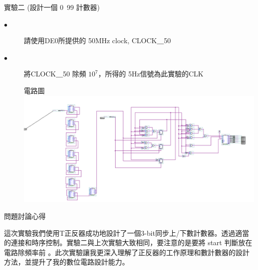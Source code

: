 \documentclass[12pt, a4paper]{article}
\begin{document}
\begin{description}
\begin{description}
          \fontsize{20pt}{22pt}\selectfont
          \item 實驗二 (設計一個 0~99 計數器)
            \fontsize{16pt}{18pt}\selectfont
              \begin{description}
                \item [$\bullet$]請使用DE0所提供的 50MHz clock, CLOCK＿50
                \item [$\bullet$] 將CLOCK＿50 除頻 $10^7$，所得的 5Hz信號為此實驗的CLK\\
                \fontsize{18pt}{20pt}
                  \item []電路圖 \\[.3cm]
                    \includegraphics[width=13cm]{./image/ex2.png}
              \end{description}
            \normalsize
        \normalsize
      \end{description}
    \item [三]問題討論心得 \\[.6cm]
      \begin{minipage}[t]{\linewidth}
        \fontsize{16}{18}\selectfont
        這次實驗我們使用T正反器成功地設計了一個3-bit同步上/下數計數器。透過適當的連接和時序控制。實驗二與上次實驗大致相同，要注意的是要將 start 判斷放在電路除頻率前
        。此次實驗讓我更深入理解了正反器的工作原理和數計數器的設計方法，並提升了我的數位電路設計能力。
      \end{minipage}
  \normalsize
\end{description}
\end{document}
